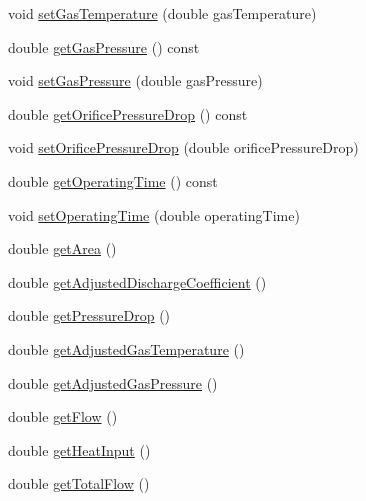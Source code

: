 \begin{DoxyCompactItemize}
\item 
void \hyperlink{class_flow_calculations_energy_use_a80db5465d8a0354da31a7f90c759ea1f}{set\+Gas\+Temperature} (double gas\+Temperature)
\item 
double \hyperlink{class_flow_calculations_energy_use_af98e97bce88915e6fdd7a0caf837049c}{get\+Gas\+Pressure} () const
\item 
void \hyperlink{class_flow_calculations_energy_use_a3b87a7c24340c618ed62ced5aece36b2}{set\+Gas\+Pressure} (double gas\+Pressure)
\item 
double \hyperlink{class_flow_calculations_energy_use_ac42e5918bba0c56406f39437317a2a87}{get\+Orifice\+Pressure\+Drop} () const
\item 
void \hyperlink{class_flow_calculations_energy_use_ad4b324ecd8288d44c32d622bb26b1bff}{set\+Orifice\+Pressure\+Drop} (double orifice\+Pressure\+Drop)
\item 
double \hyperlink{class_flow_calculations_energy_use_ab44c6cad4825e30f5599f18fcbfbb873}{get\+Operating\+Time} () const
\item 
void \hyperlink{class_flow_calculations_energy_use_ac82800d533502c7836238dcab1f39fac}{set\+Operating\+Time} (double operating\+Time)
\item 
double \hyperlink{class_flow_calculations_energy_use_a2cfdefc20dcc3d1c5b7d3d12e66b67ee}{get\+Area} ()
\item 
double \hyperlink{class_flow_calculations_energy_use_a16444682b7c914d18d8456bf399b8bd2}{get\+Adjusted\+Discharge\+Coefficient} ()
\item 
double \hyperlink{class_flow_calculations_energy_use_a35aa80b2b9ea8769d56bf9e8d5837927}{get\+Pressure\+Drop} ()
\item 
double \hyperlink{class_flow_calculations_energy_use_a6efdcd6364e01577dda38dc49601df53}{get\+Adjusted\+Gas\+Temperature} ()
\item 
double \hyperlink{class_flow_calculations_energy_use_a8633821730568a5b1449914060c52aad}{get\+Adjusted\+Gas\+Pressure} ()
\item 
double \hyperlink{class_flow_calculations_energy_use_a6b892e984bd09e821cb642f8f8efd221}{get\+Flow} ()
\item 
double \hyperlink{class_flow_calculations_energy_use_af2d2196911d4784d72b14dff83295b19}{get\+Heat\+Input} ()
\item 
double \hyperlink{class_flow_calculations_energy_use_a154ce8f8307b443366b99719987dd725}{get\+Total\+Flow} ()
\end{DoxyCompactItemize}


